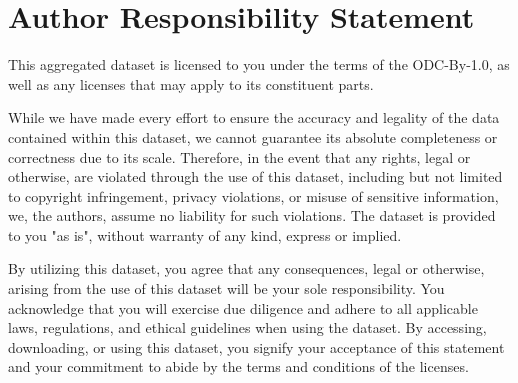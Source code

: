 \documentclass{article}
\begin{document}
\begin{table}[!tbp]
\centering
\caption{
Evaluations on multiple choice tasks for the 1.6B parameter LM.
}
\label{tab:1_6b-mc-results}
\end{table}


\newpage
\section{Author Responsibility Statement}
This aggregated dataset is licensed to you under the terms of the ODC-By-1.0, as well as any licenses that may apply to its constituent parts.

While we have made every effort to ensure the accuracy and legality of the data contained within this dataset, we cannot guarantee its absolute completeness or correctness due to its scale. Therefore, in the event that any rights, legal or otherwise, are violated through the use of this dataset, including but not limited to copyright infringement, privacy violations, or misuse of sensitive information, we, the authors, assume no liability for such violations. The dataset is provided to you "as is", without warranty of any kind, express or implied.

By utilizing this dataset, you agree that any consequences, legal or otherwise, arising from the use of this dataset will be your sole responsibility. You acknowledge that you will exercise due diligence and adhere to all applicable laws, regulations, and ethical guidelines when using the dataset. By accessing, downloading, or using this dataset, you signify your acceptance of this statement and your commitment to abide by the terms and conditions of the licenses.
\end{document}
